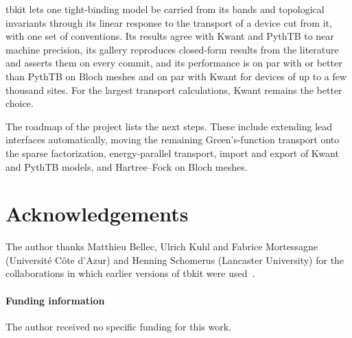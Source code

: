 \documentclass[submission, Phys]{SciPost}
\begin{document}
tbkit lets one tight-binding model be carried from its bands and
topological invariants through its linear response to the transport of a
device cut from it, with one set of conventions. Its results agree with
Kwant and PythTB to near machine precision, its gallery reproduces
closed-form results from the literature and asserts them on every commit,
and its performance is on par with or better than PythTB on Bloch meshes and on par with Kwant
for devices of up to a few thousand sites. For the largest transport
calculations, Kwant remains the better choice.

The roadmap of the project lists the next steps. These include extending
lead interfaces automatically, moving the remaining Green's-function
transport onto the sparse factorization, energy-parallel transport, import
and export of Kwant and PythTB models, and Hartree--Fock on Bloch meshes.

\section*{Acknowledgements}
The author thanks Matthieu Bellec, Ulrich Kuhl and Fabrice Mortessagne
(Universit\'e C\^ote d'Azur) and Henning Schomerus (Lancaster
University) for the collaborations in which earlier versions of tbkit were
used~\cite{poli2014,poli2015,keil2016,poli2017,bellec2020}.

\paragraph{Funding information}
The author received no specific funding for this work.


\end{document}
